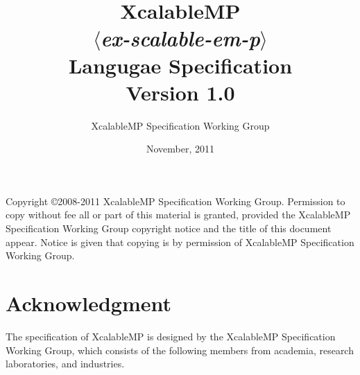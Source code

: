 \documentclass[a4paper,11pt]{report}
\title{{\Huge XcalableMP}\\
$\langle${\it ex-scalable-em-p}$\rangle$\\
Langugae Specification\\
\vspace{2cm}
Version 1.0\\}
\author{
\Large XcalableMP Specification Working Group\\
}
\date{\vspace{4cm}\Large November, 2011}
\def\XMP{XcalableMP}
\begin{document}
\maketitle

Copyright \copyright 2008-2011 {\XMP} Specification Working Group.
Permission to copy without fee all or part of this material is granted,
provided the {\XMP} Specification Working Group copyright notice and the
title of this document appear. Notice is given that copying is by permission
of {\XMP} Specification Working Group.

\tableofcontents
\listoffigures

\chapter*{Acknowledgment}

The specification of {\XMP} is designed by the {\XMP} Specification
Working Group, which consists of the following members from academia,
research laboratories, and industries.
\end{document}

